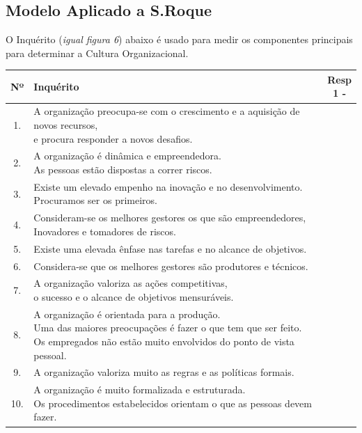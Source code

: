 \subsection{Modelo Aplicado a S.Roque}
O Inquérito (\textit{igual figura 6}) abaixo é usado para medir os componentes principais para determinar a Cultura Organizacional.
\begin{table}[h!]
\begin{adjustbox}{max width=\textwidth}
\begin{tabular}{ |c|l|c| }
\hline
\rowcolor[gray]{0.5}
Nº & Inquérito & \makecell[l]{Resp \\ 1 \; - \; 7} \\
\hline
1. & \makecell[l]{A organização preocupa-se com o crescimento e a aquisição de novos recursos, \\ e procura responder a novos desafios.} & \\
\hline
2. & \makecell[l]{A organização é dinâmica e empreendedora. \\ As pessoas estão dispostas a correr riscos.} & \\
\hline
3. & \makecell[l]{Existe um elevado empenho na inovação e no desenvolvimento. \\ Procuramos ser os primeiros.} & \\
\hline
4. & \makecell[l]{Consideram-se os melhores gestores os que são empreendedores, \\ Inovadores e tomadores de riscos.} & \\
\hline
5. & Existe uma elevada ênfase nas tarefas e no alcance de objetivos. & \\
\hline
6. & Considera-se que os melhores gestores são produtores e técnicos. & \\
\hline
7. & \makecell[l]{A organização valoriza as ações competitivas, \\ o sucesso e o alcance de objetivos mensuráveis.} & \\
\hline
8. & \makecell[l]{A organização é orientada para a produção. \\ Uma das maiores preocupações é fazer o que tem que ser feito. \\ Os empregados não estão muito envolvidos do ponto de vista pessoal.} & \\
\hline
9. & A organização valoriza muito as regras e as políticas formais. & \\
\hline
10. & \makecell[l]{A organização é muito formalizada e estruturada. \\ Os procedimentos estabelecidos orientam o que as pessoas devem fazer.} & \\

\end{tabular}
\end{adjustbox}
\end{table}
